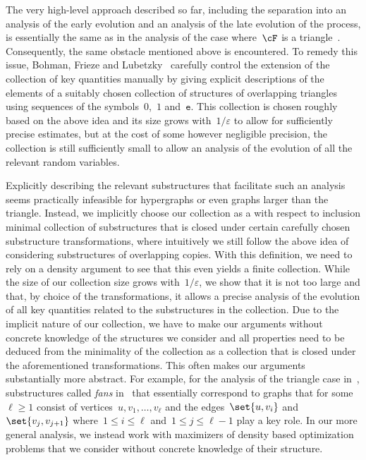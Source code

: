 \documentclass[11pt]{amsart}
\newcommand{\eps}{\varepsilon}
\theoremstyle{definition}
\numberwithin{equation}{section}
\begin{document}
	The very high-level approach described so far, including the separation into an analysis of the early evolution and an analysis of the late evolution of the process, is essentially the same as in the analysis of the case where~$\cF$ is a triangle~\cite{BFL:15}.
	Consequently, the same obstacle mentioned above is encountered.
	To remedy this issue, Bohman, Frieze and Lubetzky~\cite{BFL:15} carefully control the extension of the collection of key quantities manually by giving explicit descriptions of the elements of a suitably chosen collection of structures of overlapping triangles using sequences of the symbols~$0$,~$1$ and~$\texttt{e}$.
	This collection is chosen roughly based on the above idea and its size grows with~$1/\eps$ to allow for sufficiently precise estimates, but at the cost of some however negligible precision, the collection is still sufficiently small to allow an analysis of the evolution of all the relevant random variables.
	
	Explicitly describing the relevant substructures that facilitate such an analysis seems practically infeasible for hypergraphs or even graphs larger than the triangle.
	Instead, we implicitly choose our collection as a with respect to inclusion minimal collection of substructures that is closed under certain carefully chosen substructure transformations, where intuitively we still follow the above idea of considering substructures of overlapping copies.
	With this definition, we need to rely on a density argument to see that this even yields a finite collection.
	While the size of our collection size grows with~$1/\eps$, we show that it is not too large and that, by choice of the transformations, it allows a precise analysis of the evolution of all key quantities related to the substructures in the collection.
	Due to the implicit nature of our collection, we have to make our arguments without concrete knowledge of the structures we consider and all properties need to be deduced from the minimality of the collection as a collection that is closed under the aforementioned transformations.
	This often makes our arguments substantially more abstract.
	For example, for the analysis of the triangle case in~\cite{BFL:15}, substructures called \emph{fans} in~\cite{BFL:15} that essentially correspond to graphs that for some~$\ell\geq 1$ consist of vertices~$u,v_1,\ldots,v_\ell$ and the edges~$\set{u,v_i}$ and~$\set{v_{j},v_{j+1}}$ where~$1\leq i\leq\ell$ and~$1\leq j\leq\ell-1$ play a key role.
	In our more general analysis, we instead work with maximizers of density based optimization problems that we consider without concrete knowledge of their structure.
	
\end{document}
